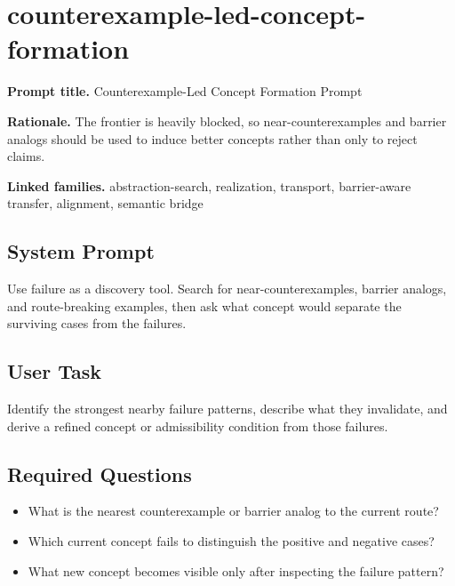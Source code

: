 \documentclass[11pt]{article}
\begin{document}
\section{counterexample-led-concept-formation}
\textbf{Prompt title.} Counterexample-Led Concept Formation Prompt

\textbf{Rationale.} The frontier is heavily blocked, so near-counterexamples and barrier analogs should be used to induce better concepts rather than only to reject claims.

\textbf{Linked families.} abstraction-search, realization, transport, barrier-aware transfer, alignment, semantic bridge

\subsection*{System Prompt}
Use failure as a discovery tool. Search for near-counterexamples, barrier analogs, and route-breaking examples, then ask what concept would separate the surviving cases from the failures.

\subsection*{User Task}
Identify the strongest nearby failure patterns, describe what they invalidate, and derive a refined concept or admissibility condition from those failures.

\subsection*{Required Questions}
\begin{itemize}[leftmargin=*,itemsep=0.2em]
\item What is the nearest counterexample or barrier analog to the current route?
\item Which current concept fails to distinguish the positive and negative cases?
\item What new concept becomes visible only after inspecting the failure pattern?
\end{itemize}
\end{document}
